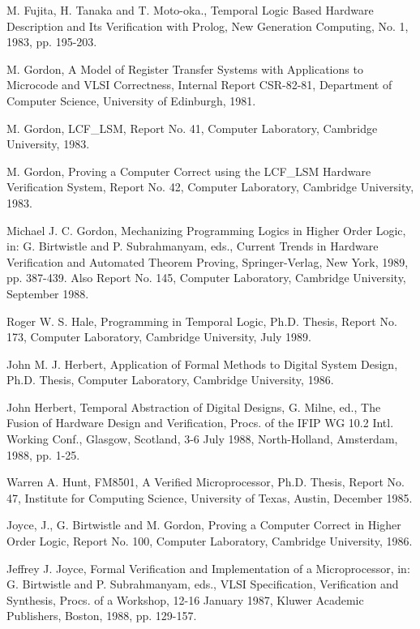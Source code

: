 \begin{thebibliography}{99}
M. Fujita, H. Tanaka and T. Moto-oka.,
Temporal Logic Based Hardware Description
and Its Verification with Prolog,
New Generation Computing, No. 1,
1983,
pp. 195-203.

M. Gordon,
A Model of Register Transfer Systems with Applications to Microcode
and VLSI Correctness,
Internal Report CSR-82-81,
Department of Computer Science,
University of Edinburgh,
1981.

M. Gordon,
LCF\_LSM,
Report No. 41, Computer Laboratory, Cambridge University,
1983.

M. Gordon,
Proving a
Computer Correct using the LCF\_LSM Hardware Verification System,
Report No. 42, Computer Laboratory, Cambridge University,
1983.

Michael J. C. Gordon,
Mechanizing Programming Logics in Higher Order Logic, in:
G. Birtwistle and P. Subrahmanyam, eds.,
Current Trends in Hardware Verification and Automated Theorem Proving,
Springer-Verlag, New York, 1989,
pp. 387-439.
Also Report No. 145, Computer Laboratory, Cambridge University,
September 1988.

Roger W. S. Hale,
Programming in Temporal Logic,
Ph.D. Thesis,
Report No. 173, Computer Laboratory, Cambridge University,
July 1989.

John M. J. Herbert,
Application of Formal Methods to Digital System Design,
Ph.D. Thesis,
Computer Laboratory,
Cambridge University,
1986.

John Herbert,
Temporal Abstraction of Digital Designs,
G. Milne, ed.,
The Fusion of Hardware Design and Verification,
Procs. of the IFIP WG 10.2 Intl. Working Conf.,
Glasgow, Scotland, 3-6 July 1988,
North-Holland, Amsterdam, 1988,
pp. 1-25.

Warren A. Hunt,
FM8501, A Verified Microprocessor,
Ph.D. Thesis,
Report No. 47,
Institute for Computing Science, University of Texas, Austin,
December 1985.

Joyce, J., G. Birtwistle and M. Gordon,
Proving a Computer Correct in Higher Order Logic,
Report No. 100, Computer Laboratory,
Cambridge University,
1986.

Jeffrey J. Joyce,
Formal Verification and Implementation of a Microprocessor, in:
G. Birtwistle and P. Subrahmanyam, eds.,
VLSI Specification, Verification and Synthesis,
Procs. of a Workshop,
12-16 January 1987,
Kluwer Academic Publishers, Boston, 1988,
pp. 129-157.


\end{thebibliography}
